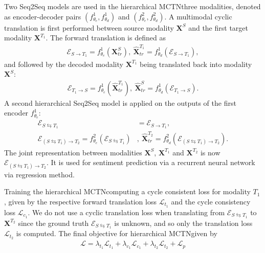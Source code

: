 \documentclass[letterpaper]{article} %
\newcommand{\ours}{MCTN}
\begin{document}
Two Seq2Seq models are used in the hierarchical \ours \for three modalities, denoted as encoder-decoder pairs $(f_{\theta_e}^1,f_{\theta_d}^1)$ and $(f_{\theta_e}^2,f_{\theta_d}^2)$. A multimodal cyclic translation is first performed between source modality $\mathbf{X}^{S}$ and the first target modality $\mathbf{X}^{T_1}$. The forward translation is defined as
\begin{align}{\mathcal{E}}_{S \rightarrow T_1} = f_{\theta_e}^1 (\mathbf{X}^{S}_{tr}), \ \hat{\mathbf{X}}^{T_1}_{tr} = f_{\theta_d}^1 ({\mathcal{E}}_{S \rightarrow T_1}),
\end{align}
and followed by the decoded modality $\mathbf{X}^{T_1}$ being translated back into modality $\mathbf{X}^{S}$:
\begin{align}{\mathcal{E}}_{T_1 \rightarrow S} = f_{\theta_e}^1(\hat{\mathbf{X}}^{T_1}_{tr}), \ \hat{\mathbf{X}}^{S}_{tr} = f_{\theta_d}^1 ({\mathcal{E}}_{T_1 \rightarrow S}).
\end{align}
A second hierarchical Seq2Seq model is applied on the outputs of the first encoder $f_{\theta_e}^1$:
\begin{align}{\mathcal{E}}_{S \leftrightarrows T_1} &= {\mathcal{E}}_{S \rightarrow T_1}, \\
{\mathcal{E}}_{(S \leftrightarrows T_1) \rightarrow T_2} = f_{\theta_e}^2 ({\mathcal{E}}_{S \leftrightarrows T_1})&, \ \hat{\mathbf{X}}^{T_2}_{tr} = f_{\theta_d}^2 ({\mathcal{E}}_{(S \leftrightarrows T_1) \rightarrow T_2}).
\end{align}
The joint representation between modalities $\mathbf{X}^{S}$, $\mathbf{X}^{T_1}$ and $\mathbf{X}^{T_2}$ is now ${\mathcal{E}}_{(S \leftrightarrows T_1) \rightarrow T_2}$. 
It is used for sentiment prediction via a recurrent neural network 
via regression method.

Training the hierarchical \ours \involves computing a cycle consistent loss for modality $T_1$, given by the respective forward translation loss $\mathcal{L}_{t_1}$ and the cycle consistency loss $\mathcal{L}_{c_1}$. We do not use a cyclic translation loss when translating from ${\mathcal{E}}_{S \leftrightarrows T_1}$ to $\mathbf{X}^{T_2}$ since the ground truth ${\mathcal{E}}_{S \leftrightarrows T_1}$ is unknown, and so only the translation loss $\mathcal{L}_{t_2}$ is computed. The final objective for hierarchical \ours \is given by
\begin{align}
\mathcal{L} = \lambda_{t_1} \mathcal{L}_{t_1} + \lambda_{c_1} \mathcal{L}_{c_1} + \lambda_{t_2} \mathcal{L}_{t_2} + \mathcal{L}_p
\end{align}
\end{document}
